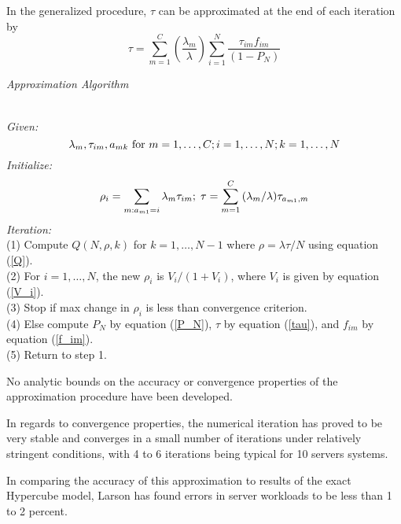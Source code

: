 In the generalized procedure, $\tau$ can be approximated at the end of each iteration by
\begin{equation} \label{tau}
  \tau = \sum_{m=1}^{C}{\left(\frac{\lambda_m}{\lambda}\right)\sum_{i=1}^{N}{\frac{\tau_{im}f_{im}}{(1-P_N)}}}
\end{equation}

{\footnotesize
  \begin{center}
    \textit{ Approximation Algorithm}
  \end{center}
  \vspace{-8pt}
  \hline \\
  \vspace{2pt}
  \textit{Given:}
  \begin{equation*}
    \lambda_m,\tau_{im},a_{mk}\mbox{  for } m = 1,\ldots,C;i=1,\ldots,N;k=1,\ldots,N \hfill
  \end{equation*}
  \textit{Initialize:}
  \begin{equation*}
    \rho_i = \sum_{m: a_{m1} = i}{\lambda_m \tau_{im}}; \; \tau = \sum_{m=1}^{C}{(\lambda_m/\lambda)\tau_{a_{m1},m}} \hfill
  \end{equation*}
  \textit{Iteration:}\\
  (1) Compute $Q(N,\rho,k)$ for $k = 1,\ldots,N-1$ where $\rho = \lambda \tau / N$ using equation (\ref{Q}). \\
  (2) For $i = 1,\ldots,N$, the new $\rho_i$ is $V_i/(1+V_i)$, where $V_i$ is given by equation (\ref{V_i}). \\
  (3) Stop if max change in $\rho_i$ is less than convergence criterion. \\
  (4) Else compute $P_N$ by equation (\ref{P_N}), $\tau$ by equation (\ref{tau}), and $f_{im}$ by equation (\ref{f_im}). \\
  (5) Return to step 1. \\
  \hline
}

No analytic bounds on the accuracy or convergence properties of the approximation procedure have been developed.

In regards to convergence properties,
the numerical iteration has proved to be very stable and converges in a small number of iterations under relatively stringent conditions,
with 4 to 6 iterations being typical for 10 servers systems.

In comparing the accuracy of this approximation to results of the exact Hypercube model,
Larson has found errors in server workloads to be less than 1 to 2 percent.
